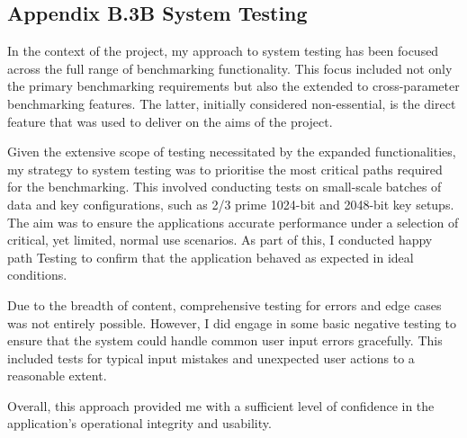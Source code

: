 \documentclass[]{final_report}
\theoremstyle{definition}
\begin{document}
\subsection{Appendix B.3B System Testing}
In the context of the project, my approach to system testing has been focused across the full range of benchmarking functionality.
This focus included not only the primary benchmarking requirements but also the extended to cross-parameter benchmarking features. The latter, initially considered non-essential, is the direct feature that was used to deliver on the aims of the project.


Given the extensive scope of testing necessitated by the expanded functionalities, my strategy to system testing was to prioritise the most critical paths required for the benchmarking. This involved conducting tests on small-scale batches of data and  key configurations, such as 2/3 prime 1024-bit and 2048-bit key setups. The aim was to ensure the applications accurate performance under a selection of critical, yet limited, normal use scenarios. As part of this, I conducted happy path Testing to confirm that the application behaved as expected in ideal conditions.

Due to the breadth of content, comprehensive testing for errors and edge cases was not entirely possible. However, I did engage in some basic negative testing to ensure that the system could handle common user input errors gracefully. This included tests for typical input mistakes and unexpected user actions to a reasonable extent.

Overall, this approach provided me with a sufficient level of confidence in the application's operational integrity and usability.

\end{document}
